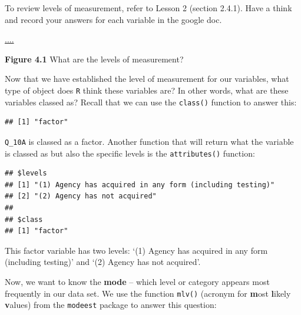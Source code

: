 \documentclass[
]{book}
\newenvironment{Shaded}{\begin{snugshade}}{\end{snugshade}}
\newcommand{\CommentTok}[1]{\textcolor[rgb]{0.56,0.35,0.01}{\textit{#1}}}
\newcommand{\FunctionTok}[1]{\textcolor[rgb]{0.00,0.00,0.00}{#1}}
\newcommand{\NormalTok}[1]{#1}
\newcommand{\SpecialCharTok}[1]{\textcolor[rgb]{0.00,0.00,0.00}{#1}}
\begin{document}
To review levels of measurement, refer to Lesson 2 (section 2.4.1). Have a think and record your answers for each variable in the google doc.

\url{....}

\textbf{Figure 4.1} What are the levels of measurement?

Now that we have established the level of measurement for our variables, what type of object does \texttt{R} think these variables are? In other words, what are these variables classed as? Recall that we can use the \texttt{class()} function to answer this:

\begin{Shaded}
\end{Shaded}

\begin{verbatim}
## [1] "factor"
\end{verbatim}

\texttt{Q\_10A} is classed as a factor. Another function that will return what the variable is classed as but also the specific levels is the \texttt{attributes()} function:

\begin{Shaded}
\end{Shaded}

\begin{verbatim}
## $levels
## [1] "(1) Agency has acquired in any form (including testing)"
## [2] "(2) Agency has not acquired"                            
## 
## $class
## [1] "factor"
\end{verbatim}

This factor variable has two levels: `(1) Agency has acquired in any form (including testing)' and `(2) Agency has not acquired'.

Now, we want to know the \textbf{mode} -- which level or category appears most frequently in our data set. We use the function \texttt{mlv()} (acronym for \textbf{m}ost \textbf{l}ikely \textbf{v}alues) from the \texttt{modeest} package to answer this question:

\begin{Shaded}
\end{Shaded}
\end{document}
